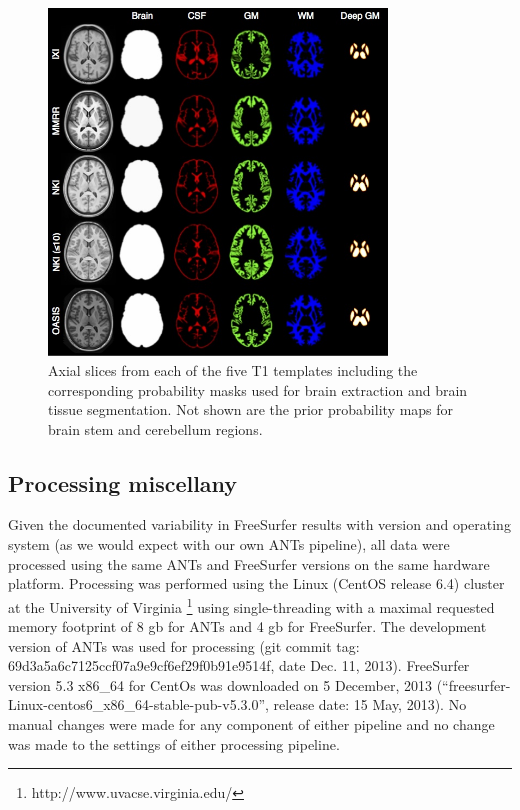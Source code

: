 \begin{figure}
  \centering
  \includegraphics[width=90mm]{Figures/templateProbabilityMasks.jpg}
  \caption{Axial slices from each of the five T1 templates including the corresponding
  probability masks used for brain extraction and brain tissue segmentation.  Not shown
  are the prior probability maps for brain stem and cerebellum regions.
  }
  \label{fig:templateMasks}
\end{figure}


\subsection{Processing miscellany}

Given the documented variability in FreeSurfer results with version and
operating system \citep{gronenschild2012} (as we would expect with our own ANTs pipeline),
all data were processed using the same ANTs and FreeSurfer versions on the same 
hardware platform.  Processing was performed using the Linux (CentOS release 6.4) 
cluster at the University 
of Virginia%
\footnote{
http://www.uvacse.virginia.edu/
}
using single-threading with a maximal requested memory footprint of 8 gb for ANTs 
and 4 gb for FreeSurfer.  The development version of ANTs was used for processing 
(git commit tag: 69d3a5a6c7125ccf07a9e9cf6ef29f0b91e9514f, date Dec. 11, 2013).  
FreeSurfer version 5.3 x86\_64 for CentOs was downloaded 
on 5 December, 2013 (``freesurfer-Linux-centos6\_x86\_64-stable-pub-v5.3.0'', release
date: 15 May, 2013).   {\color{blue}{The brain extraction and segmentation results from both 
pipelines were visually inspected to screen for major problems.}}
No manual changes were made for any component of either pipeline and no change was made to the settings of either processing pipeline.



